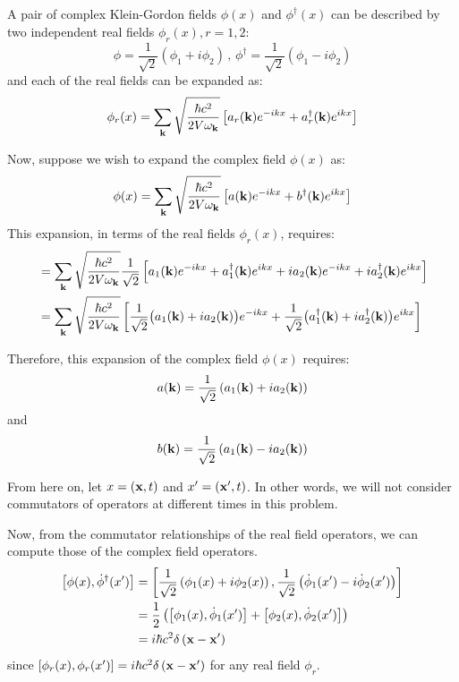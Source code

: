 \documentclass[letterpaper,12pt]{article}
\newenvironment{problem}{\subsection{}\begin{adjustwidth}{0.25in}{}\vspace{-\baselineskip}}{\end{adjustwidth}}
\begin{document}
\begin{problem}
A pair of complex Klein-Gordon fields $\phi(x)$ and $\phi^\dagger(x)$ can be described by two independent real fields $\phi_r(x), r=1,2$:
\begin{equation*}
	\phi = \frac{1}{\sqrt{2}}\left(\phi_1 + i\phi_2\right) \,, \,
	\phi^\dagger = \frac{1}{\sqrt{2}}\left(\phi_1 - i\phi_2\right)
\end{equation*}
and each of the real fields can be expanded as:
\begin{equation*}
	\phi_r(x) = \sum_{\vb{k}} \sqrt{\frac{\hbar c^2}{2V \omega_{\vb{k}}}} \left[a_r(\vb{k})e^{-ikx} + a^\dagger_r(\vb{k})e^{ikx}\right]
\end{equation*}

Now, suppose we wish to expand the complex field $\phi(x)$ as:
\begin{equation*}
	\phi(x) = \sum_{\vb{k}} \sqrt{\frac{\hbar c^2}{2V \omega_{\vb{k}}}} \left[a(\vb{k})e^{-ikx} + b^\dagger(\vb{k})e^{ikx}\right]
\end{equation*}
This expansion, in terms of the real fields $\phi_r(x)$, requires:
\begin{align*}
	&= \sum_{\vb{k}} \sqrt{\frac{\hbar c^2}{2V \omega_{\vb{k}}}} \frac{1}{\sqrt{2}}\left[a_1(\vb{k})e^{-ikx} + a^\dagger_1(\vb{k})e^{ikx} + ia_2(\vb{k})e^{-ikx} + ia^\dagger_2(\vb{k})e^{ikx}\right]	\\
	&= \sum_{\vb{k}} \sqrt{\frac{\hbar c^2}{2V \omega_{\vb{k}}}}
	\left[\frac{1}{\sqrt{2}}\big(a_1(\vb{k}) + ia_2(\vb{k})\big)e^{-ikx} + \frac{1}{\sqrt{2}}\big(a^\dagger_1(\vb{k}) + ia^\dagger_2(\vb{k})\big)e^{ikx}\right]
\end{align*}

Therefore, this expansion of the complex field $\phi(x)$ requires:
\begin{align*}
	a(\vb{k}) = \frac{1}{\sqrt{2}}\left(a_1(\vb{k}) + ia_2(\vb{k})\right)
\end{align*}
and
\begin{align*}
	b(\vb{k}) = \frac{1}{\sqrt{2}}\left(a_1(\vb{k}) - ia_2(\vb{k})\right)		 
\end{align*}

From here on, let $x=(\vb{x},t)$ and $x'=(\vb{x}',t)$. In other words, we will not consider commutators of operators at different times in this problem.

Now, from the commutator relationships of the real field operators, we can compute those of the complex field operators.
\begin{align*}
	\left[\phi(x), \dot{\phi}^\dagger(x')\right]
	&= \left[\frac{1}{\sqrt{2}}\left(\phi_1(x)+i\phi_2(x)\right), \frac{1}{\sqrt{2}}\left(\dot{\phi}_1(x') - i\dot{\phi}_2(x')\right)\right]	\\
	&= \frac{1}{2}\left(\left[\phi_1(x), \dot{\phi}_1(x')\right] + \left[\phi_2(x), \dot{\phi}_2(x')\right]\right)	\\
	&= i\hbar c^2 \delta\left(\vb{x}-\vb{x}'\right)
\end{align*}
since $\left[\phi_r(x), \phi_r(x')\right] = i \hbar c^2 \delta\left(\vb{x}-\vb{x}'\right)$ for any real field $\phi_r$.


\end{problem}
\end{document}

